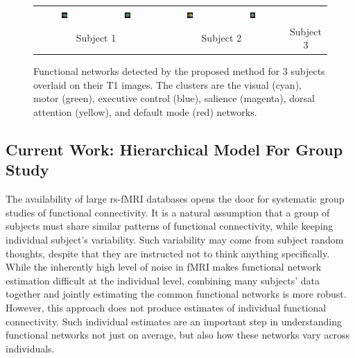 \documentclass[12pt]{article}
\begin{document}
\begin{figure}[htb]
\begin{center}
\begin{tabular}{cccccc}
      \includegraphics[width=0.1\textwidth]{figures/wholebrain/sub2/saggital0029} &
      \includegraphics[width=0.1\textwidth]{figures/wholebrain/sub2/coronal0029} &
      \includegraphics[width=0.1\textwidth]{figures/wholebrain/sub5/saggital0029} &
      \includegraphics[width=0.1\textwidth]{figures/wholebrain/sub5/coronal0029}\\

      \multicolumn{2}{c}{\small Subject 1} &
      \multicolumn{2}{c}{\small Subject 2} &
      \multicolumn{2}{c}{\small Subject 3}
    \end{tabular}
  \end{center}
  \caption {Functional networks detected by the proposed method for 3 subjects
    overlaid on their T1 images.  The clusters are the visual (cyan), motor
    (green), executive control (blue), salience (magenta), dorsal attention
    (yellow), and default mode (red) networks.}
  \label{fig:wholebrain}
\end{figure}

\subsection{Current Work: Hierarchical Model For Group Study} \label{sec:hier}

The availability of large rs-fMRI databases opens the door for systematic group
studies of functional connectivity. It is a natural assumption that a group of
subjects must share similar patterns of functional connectivity, while keeping
individual subject's variability. Such variability may come from subject random
thoughts, despite that they are instructed not to think anything
specifically. While the inherently high level of noise in fMRI makes functional
network estimation difficult at the individual level, combining many subjects'
data together and jointly estimating the common functional networks is more
robust. However, this approach does not produce estimates of individual
functional connectivity. Such individual estimates are an important step in
understanding functional networks not just on average, but also how these
networks vary across individuals.
\end{document}
